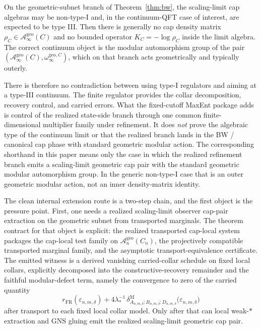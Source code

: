 \documentclass[11pt]{article}
\begin{document}
On the geometric-subnet branch of Theorem~\ref{thm:bw}, the scaling-limit cap algebras may be non-type-I and, in the continuum-QFT case of interest, are expected to be type III. Then there is generally no cap density matrix \(\rho_C\in \mathcal A_\infty^{\mathrm{geo}}(C)\) and no bounded operator \(K_C=-\log\rho_C\) inside the limit algebra. The correct continuum object is the modular automorphism group of the pair \((\mathcal A_\infty^{\mathrm{geo}}(C),\omega_\infty^{\mathrm{geo},C})\), which on that branch acts geometrically and typically outerly.

There is therefore no contradiction between using type-I regulators and aiming at a type-III continuum. The finite regulator provides the collar decomposition, recovery control, and carried errors. What the fixed-cutoff MaxEnt package adds is control of the realized state-side branch through one common finite-dimensional multiplier family under refinement. It does \emph{not} prove the algebraic type of the continuum limit or that the realized branch lands in the BW / canonical cap phase with standard geometric modular action. The corresponding shorthand in this paper means only the case in which the realized refinement branch emits a scaling-limit geometric cap pair with the standard geometric modular automorphism group. In the generic non-type-I case that is an outer geometric modular action, not an inner density-matrix identity.

The clean internal extension route is a two-step chain, and the first object is the pressure point. First, one needs a realized scaling-limit observer cap-pair extraction on the geometric subnet from transported marginals. The theorem contract for that object is explicit: the realized transported cap-local system packages the cap-local test family on \(\mathcal A_n^{\mathrm{geo}}(C_n)\), the projectively compatible transported marginal family, and the asymptotic transport-equivalence certificate. The emitted witness is a derived vanishing carried-collar schedule on fixed local collars, explicitly decomposed into the constructive-recovery remainder and the faithful modular-defect term, namely the convergence to zero of the carried quantity
\[
r_{\mathrm{FR}}(\varepsilon_{n,m,\delta})
+
4\lambda_\ast^{-1}\,
\delta^{\mathrm M}_{A_{n,m,\delta}:B_{n,m,\delta}:D_{n,m,\delta}}
\bigl(\varepsilon_{n,m,\delta}\bigr)
\]
after transport to each fixed local collar model. Only after that can local weak-\(*\) extraction and GNS gluing emit the realized scaling-limit geometric cap pair.
\end{document}
